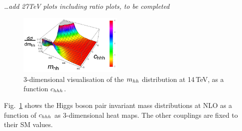 {\it \ldots add 27TeV plots including ratio plots, to be completed}

\begin{figure}[ht]
\begin{center}
  \includegraphics[width=0.45\textwidth]{section3/plots/3D_mhh_chhh.pdf}    
\end{center}
\caption{3-dimensional visualisation of the $m_{hh}$ distribution at
  14\,TeV, as a function  $c_{hhh}$.}
\label{fig:chhh_3D}
\end{figure}
Fig.~\ref{fig:chhh_3D} shows the Higgs boson pair invariant mass
distributions at NLO as a function of $c_{hhh}$  as 3-dimensional heat maps.
The other couplings are fixed to their SM values.
 
%


